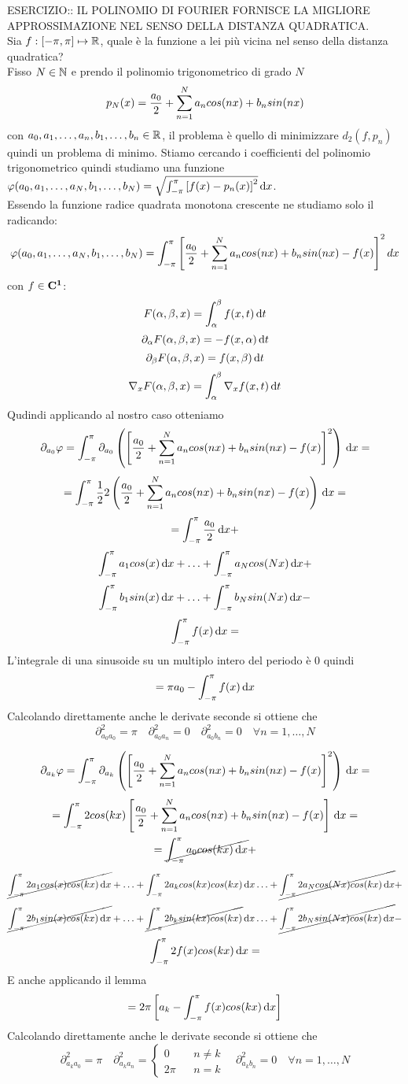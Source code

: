 ESERCIZIO:: IL POLINOMIO DI FOURIER FORNISCE LA MIGLIORE APPROSSIMAZIONE NEL SENSO DELLA DISTANZA QUADRATICA.\\
Sia $f: \left[-\pi,\pi\right] \mapsto \mathbb{R}$, quale è la funzione a lei più vicina nel senso della distanza quadratica?\\
Fisso $N\in\mathbb{N}$ e prendo il polinomio trigonometrico di grado $N$
\[p_N(x)=\frac{a_0}{2}+\sum\limits_{n=1}^{N}a_{n}cos(nx)+b_{n}sin(nx)\]
con $a_0,a_1,\dotsc,a_n,b_1,\dotsc,b_n\in \mathbb{R}$, il problema è quello di minimizzare $d_2(f,p_n)$ quindi un problema di minimo. Stiamo cercando i coefficienti del polinomio trigonometrico quindi studiamo una funzione $\varphi(a_0,a_1,\dotsc,a_N,b_1,\dotsc,b_N) = \sqrt{\int_{-\pi}^{\pi}\left[f(x)-p_n(x)\right]^2}\,\mathrm{d}{x}$.\\
Essendo la funzione radice quadrata monotona crescente ne studiamo solo il radicando:
\[\varphi(a_0,a_1,\dotsc,a_N,b_1,\dotsc,b_N)=\int_{-\pi}^{\pi}\left[\frac{a_0}{2}+\sum\limits_{n=1}^{N}a_{n}cos(nx)+b_{n}sin(nx)-f(x)\right]^2dx\]
\observation
con $f\in \mathbf{C^{1}}$:
\[F(\alpha,\beta,x)=\int_{\alpha}^{\beta}f(x,t)\,\mathrm{d}{t}\]
\[\partial_\alpha F(\alpha,\beta,x)=-f(x,\alpha)\,\mathrm{d}{t}\]
\[\partial_\beta F(\alpha,\beta,x)=f(x,\beta)\,\mathrm{d}{t}\]
\[\nabla_x F(\alpha,\beta,x)=\int_{\alpha}^{\beta}\nabla_xf(x,t)\,\mathrm{d}{t}\]
Qudindi applicando al nostro caso otteniamo
\[\partial_{a_0}\varphi = \int_{-\pi}^{\pi}\partial_{a_0}\left(\left[\frac{a_0}{2}+\sum\limits_{n=1}^{N}a_{n}cos(nx)+b_{n}sin(nx)-f(x)\right]^2\right)\,\mathrm{d}{x}=\]
\[ = \int_{-\pi}^{\pi} \frac{1}{2}2\left(\frac{a_0}{2}+\sum\limits_{n=1}^{N}a_{n}cos(nx)+b_{n}sin(nx)-f(x)\right)\,\mathrm{d}{x}=\]
\[ =  \int_{-\pi}^{\pi} \frac{a_0}{2}\,\mathrm{d}{x} + \]
\[\int_{-\pi}^{\pi} a_1cos(x)\,\mathrm{d}{x} +
\ldots +
\int_{-\pi}^{\pi} a_Ncos(Nx)\,\mathrm{d}{x} + \]
\[\int_{-\pi}^{\pi} b_1sin(x)\,\mathrm{d}{x} +
\ldots +
\int_{-\pi}^{\pi} b_Nsin(Nx)\,\mathrm{d}{x} - \]
\[ \int_{-\pi}^{\pi} f(x)\,\mathrm{d}{x} = \]
L'integrale di una sinusoide su un multiplo intero del periodo è $0$ quindi
\[=\pi a_0-\int_{-\pi}^{\pi}f(x)\,\mathrm{d}{x}\]
Calcolando direttamente anche le derivate seconde si ottiene che
\[\partial^2_{a_0a_0}=\pi\quad\partial^2_{a_0a_n}=0\quad\partial^2_{a_0b_n}=0\quad\forall n=1,\dotsc,N\]

\[\partial_{a_k}\varphi = \int_{-\pi}^{\pi}\partial_{a_k}\left(\left[\frac{a_0}{2}+\sum\limits_{n=1}^{N}a_{n}cos(nx)+b_{n}sin(nx)-f(x)\right]^2\right)\,\mathrm{d}{x}=\]
\[ = \int_{-\pi}^{\pi} 2cos(kx) \left[\frac{a_0}{2}+\sum\limits_{n=1}^{N}a_{n}cos(nx)+b_{n}sin(nx)-f(x)\right]\,\mathrm{d}{x}=\]
\[ =  \cancel{\int_{-\pi}^{\pi} a_0cos(kx)\,\mathrm{d}{x}} + \]
\[\cancel{\int_{-\pi}^{\pi} 2a_1cos(x)cos(kx)\,\mathrm{d}{x}} +
\ldots +
\int_{-\pi}^{\pi} 2a_kcos(kx)cos(kx)\,\mathrm{d}{x}
\ldots +
\cancel{\int_{-\pi}^{\pi} 2a_Ncos(Nx)cos(kx)\,\mathrm{d}{x}} + \]
\[\cancel{\int_{-\pi}^{\pi} 2b_1sin(x)cos(kx)\,\mathrm{d}{x}} +
\ldots +
\cancel{\int_{-\pi}^{\pi} 2b_ksin(kx)cos(kx)}\,\mathrm{d}{x}
\ldots +
\cancel{\int_{-\pi}^{\pi} 2b_Nsin(Nx)cos(kx)\,\mathrm{d}{x}} - \]
\[\int_{-\pi}^{\pi} 2f(x)cos(kx)\,\mathrm{d}{x} = \]
E anche applicando il lemma
\[=2\pi\left[a_k-\int_{-\pi}^{\pi}f(x)cos(kx)\,\mathrm{d}{x}\right]\]
Calcolando direttamente anche le derivate seconde si ottiene che
\[\partial^2_{a_ka_0}=\pi\quad\partial^2_{a_ka_n}=
\left\{\begin{matrix}
0&&n\ne k\\2\pi&&n=k
\end{matrix}\right.
\quad\partial^2_{a_kb_n}=0\quad\forall n=1,\dotsc,N\]

